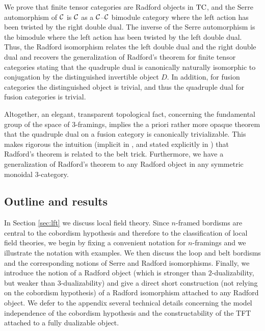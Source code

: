 \documentclass{amsart}
\begin{document}
We prove that finite tensor categories are Radford objects in $\mathrm{TC}$, and the Serre automorphism of $\mathcal C$ is $\mathcal C$ as a $\mathcal C$--$\mathcal C$ bimodule category where the left action has been twisted by the right double dual.  The inverse of the Serre automorphism is the bimodule where the left action has been twisted by the left double dual.  Thus, the Radford isomorphism relates the left double dual and the right double dual and recovers the generalization of Radford's theorem for finite tensor categories \cite{MR0407069, MR2097289} stating that the quadruple dual is canonically naturally isomorphic to conjugation by the distinguished invertible object $D$.  In addition, for fusion categories the distinguished object is trivial, and thus the quadruple dual for fusion categories is trivial.  

Altogether, an elegant, transparent topological fact, concerning the fundamental group of the space of $3$-framings, implies the a priori rather more opaque theorem that the quadruple dual on a fusion category is canonically trivializable. This makes rigorous the intuition (implicit in \cite{MR2559711}, and stated explicitly in \cite{0901.3975}) that Radford's theorem is related to the belt trick.    Furthermore, we have a generalization of Radford's theorem to any Radford object in any symmetric monoidal $3$-category.




\subsection*{Outline and results}

In Section \ref{sec:lft} we discuss local field theory.  Since $n$-framed bordisms are central to the cobordism hypothesis and therefore to the classification of local field theories, we begin by fixing a convenient notation for $n$-framings and we illustrate the notation with examples.  We then discuss the loop and belt bordisms and the corresponding notions of Serre and Radford isomorphisms.  Finally, we introduce the notion of a Radford object (which is stronger than $2$-dualizability, but weaker than $3$-dualizability) and give a direct short construction (not relying on the cobordism hypothesis) of a Radford isomorphism attached to any Radford object.  We defer to the appendix several technical details concerning the model independence of the cobordism hypothesis and the constructability of the TFT attached to a fully dualizable object.
\end{document}
